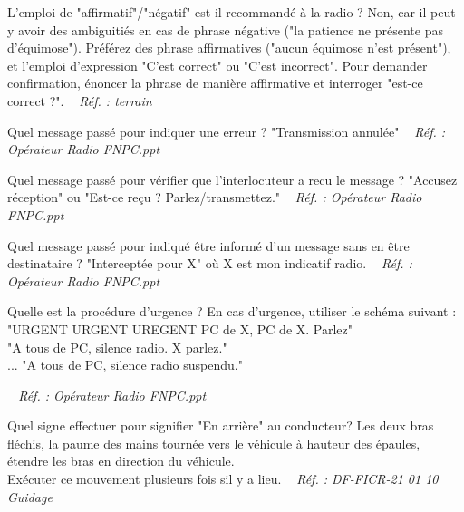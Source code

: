 \documentclass[grid,avery5371,landscape]{flashcards}
\makeatletter
\newcounter{nocarte}
\newcommand{\categ}[1]{%
  \def\@categ{#1}%
  \setcounter{nocarte}{0}%
}
\newcommand{\source}[1]{%
  \medskip
  \itshape%
   ~ \hfill Réf. : #1}
\makeatother
\begin{document}
\color[HTML]{01DFA5}
\categ{TECH}
\begin{flashcard}[radio]{
 L'emploi de "affirmatif"/"négatif" est-il recommandé à la radio ?   }
  Non, car il peut y avoir des ambiguitiés en cas de phrase négative ("la patience ne présente pas d'équimose"). 
Préférez des phrase affirmatives ("aucun équimose n'est présent"), et l'emploi d'expression "C'est correct" ou "C'est incorrect". Pour demander confirmation, énoncer la phrase de manière affirmative et interroger "est-ce correct ?".
  \source{terrain}
\end{flashcard}


\color[HTML]{01DFA5}
\categ{TECH}
\begin{flashcard}[radio]{
 Quel message passé pour indiquer une erreur ?   }
  "Transmission annulée"
  \source{Opérateur Radio FNPC.ppt}
\end{flashcard}


\color[HTML]{01DFA5}
\categ{TECH}
\begin{flashcard}[radio]{
 Quel message passé pour vérifier que l'interlocuteur a recu le message ?   }
  "Accusez réception" ou "Est-ce reçu ? Parlez/transmettez."
  \source{Opérateur Radio FNPC.ppt}
\end{flashcard}


\color[HTML]{01DFA5}
\categ{TECH}
\begin{flashcard}[radio]{
 Quel message passé pour indiqué être informé d'un message sans en être destinataire ?   }
  "Interceptée pour X" où X est mon indicatif radio.
  \source{Opérateur Radio FNPC.ppt}
\end{flashcard}


\color[HTML]{01DFA5}
\categ{TECH}
\begin{flashcard}[radio]{
 Quelle est la procédure d'urgence ?   }
  En cas d'urgence, utiliser le schéma suivant : \\
"URGENT URGENT UREGENT PC de X, PC de X. Parlez" \\
"A tous de PC, silence radio. X parlez." \\
...
"A tous de PC, silence radio suspendu."

  \source{Opérateur Radio FNPC.ppt}
\end{flashcard}


\color[HTML]{01DFA5}
\categ{TECH}
\begin{flashcard}[véhicule]{
 Quel signe effectuer pour signifier "En arrière" au conducteur?   }
  Les deux bras fléchis, la paume des mains tournée vers le véhicule à hauteur des épaules, étendre les bras en direction du véhicule. \\     Exécuter ce mouvement plusieurs fois sil y a lieu.
  \source{DF-FICR-21 01 10 Guidage}
\end{flashcard}
\end{document}

